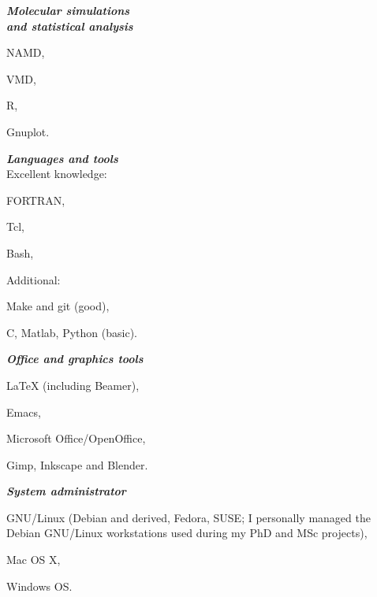 \documentclass[a4paper,10pt,final]{letter}
\newcommand{\SmallSep}{\vspace{0.4em}}
\newcommand{\CVItem}[2]
	{\textit{\textbf{\color{RoyalBlue} #1}} #2}
\begin{document}
\begin{multicols}{3}
\CVItem{Molecular simulations\\ and statistical analysis}
\begin{compactitem}[\color{RoyalBlue}$\circ$]
\item NAMD,
\item VMD,
\item R,
\item Gnuplot.
\end{compactitem}
\SmallSep 
\CVItem{Languages and 
  tools}\\
Excellent knowledge:
\begin{compactitem}[\color{RoyalBlue}$\circ$]
\item FORTRAN,
\item Tcl,
\item Bash,
\end{compactitem}
Additional:
\begin{compactitem}[\color{RoyalBlue}$\circ$]
\item Make and git (good),
\item C, Matlab, Python (basic).
\end{compactitem}
\SmallSep
\CVItem{Office and graphics tools} 
\begin{compactitem}[\color{RoyalBlue}$\circ$]
\item \LaTeX{} (including Beamer),
\item Emacs,
\item Microsoft Office/OpenOffice, 
\item Gimp, Inkscape and Blender.
\end{compactitem}
\SmallSep

\CVItem{System administrator}
\begin{compactitem}[\color{RoyalBlue}$\circ$]
\item GNU/Linux (Debian and derived, Fedora, SUSE; I personally managed the Debian
  GNU/Linux workstations used during my PhD and MSc projects),
\item Mac OS X,
\item Windows OS.
\end{compactitem}
\end{multicols}

\end{document}
